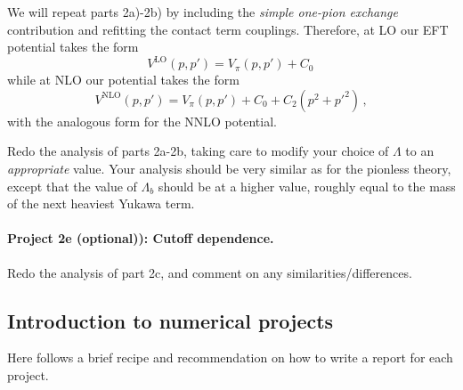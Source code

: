 \documentclass[%
oneside,                 %
final,                   %
10pt]{article}
\begin{document}
We will repeat parts 2a)-2b) by including the \emph{simple one-pion exchange}
contribution and refitting the contact term couplings. Therefore, at
LO our EFT potential takes the form
\[
V^\mathrm{LO}(p,p')= V_{\pi}(p,p') + C_0\,
\]
while at NLO our potential takes the form
\[
V^\mathrm{NLO}(p,p')= V_{\pi}(p,p') + C_0 + C_2(p^2+p'^2)\,,
\]
with the analogous form for the NNLO potential. 

Redo the analysis of parts 2a-2b, taking care to modify your choice of
$\Lambda$ to an \emph{appropriate} value.  Your analysis should be very
similar as for the pionless theory, except that the value of
$\Lambda_b$ should be at a higher value, roughly equal to the mass of
the next heaviest Yukawa term.

\paragraph{Project 2e (optional)): Cutoff dependence.}
Redo the analysis of part 2c, and comment on any similarities/differences. 


\subsection{Introduction to numerical projects}

Here follows a brief recipe and recommendation on how to write a report for each
project.
\end{document}
